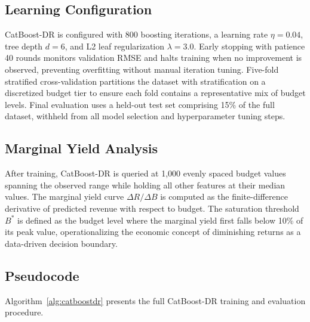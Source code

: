 \documentclass[journal]{IEEEtran}
\begin{document}
\subsection{Learning Configuration}


CatBoost-DR is configured with 800 boosting iterations, a learning rate \(\eta = 0.04\), tree depth \(d = 6\), and L2 leaf regularization \(\lambda = 3.0\). Early stopping with patience 40 rounds monitors validation RMSE and halts training when no improvement is observed, preventing overfitting without manual iteration tuning. Five-fold stratified cross-validation partitions the dataset with stratification on a discretized budget tier to ensure each fold contains a representative mix of budget levels. Final evaluation uses a held-out test set comprising 15\% of the full dataset, withheld from all model selection and hyperparameter tuning steps.

\subsection{Marginal Yield Analysis}

After training, CatBoost-DR is queried at 1,000 evenly spaced budget values spanning the observed range while holding all other features at their median values. The marginal yield curve \(\Delta R / \Delta B\) is computed as the finite-difference derivative of predicted revenue with respect to budget. The saturation threshold \(B^*\) is defined as the budget level where the marginal yield first falls below 10\% of its peak value, operationalizing the economic concept of diminishing returns as a data-driven decision boundary.

\subsection{Pseudocode}

Algorithm~\ref{alg:catboostdr} presents the full CatBoost-DR training and evaluation procedure.
\end{document}
